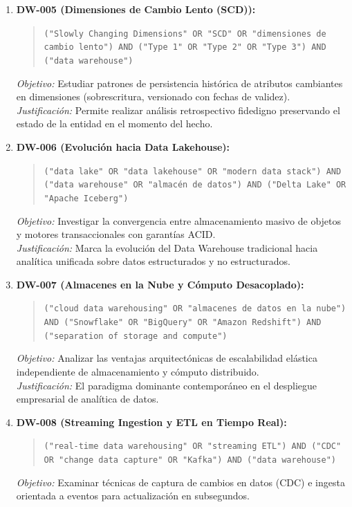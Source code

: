 \begin{enumerate}
  \textit{Justificación:} Es el debate de diseño más trascendental en la historia de la ingeniería de datos.
  \item \textbf{DW-005 (Dimensiones de Cambio Lento (SCD)):}
  \begin{quote}
  \texttt{("Slowly Changing Dimensions" OR "SCD" OR "dimensiones de cambio lento") AND ("Type 1" OR "Type 2" OR "Type 3") AND ("data warehouse")}
  \end{quote}
  \textit{Objetivo:} Estudiar patrones de persistencia histórica de atributos cambiantes en dimensiones (sobrescritura, versionado con fechas de validez).\\
  \textit{Justificación:} Permite realizar análisis retrospectivo fidedigno preservando el estado de la entidad en el momento del hecho.
  \item \textbf{DW-006 (Evolución hacia Data Lakehouse):}
  \begin{quote}
  \texttt{("data lake" OR "data lakehouse" OR "modern data stack") AND ("data warehouse" OR "almacén de datos") AND ("Delta Lake" OR "Apache Iceberg")}
  \end{quote}
  \textit{Objetivo:} Investigar la convergencia entre almacenamiento masivo de objetos y motores transaccionales con garantías ACID.\\
  \textit{Justificación:} Marca la evolución del Data Warehouse tradicional hacia analítica unificada sobre datos estructurados y no estructurados.
  \item \textbf{DW-007 (Almacenes en la Nube y Cómputo Desacoplado):}
  \begin{quote}
  \texttt{("cloud data warehousing" OR "almacenes de datos en la nube") AND ("Snowflake" OR "BigQuery" OR "Amazon Redshift") AND ("separation of storage and compute")}
  \end{quote}
  \textit{Objetivo:} Analizar las ventajas arquitectónicas de escalabilidad elástica independiente de almacenamiento y cómputo distribuido.\\
  \textit{Justificación:} El paradigma dominante contemporáneo en el despliegue empresarial de analítica de datos.
  \item \textbf{DW-008 (Streaming Ingestion y ETL en Tiempo Real):}
  \begin{quote}
  \texttt{("real-time data warehousing" OR "streaming ETL") AND ("CDC" OR "change data capture" OR "Kafka") AND ("data warehouse")}
  \end{quote}
  \textit{Objetivo:} Examinar técnicas de captura de cambios en datos (CDC) e ingesta orientada a eventos para actualización en subsegundos.\\

\end{enumerate}

